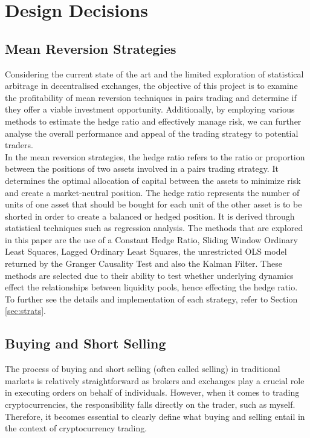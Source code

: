 \chapter{Design Decisions}

\section{Mean Reversion Strategies}
Considering the current state of the art and the limited exploration of statistical arbitrage in decentralised exchanges, the objective of this project is to examine the profitability of mean reversion techniques in pairs trading and determine if they offer a viable investment opportunity. Additionally, by employing various methods to estimate the hedge ratio and effectively manage risk, we can further analyse the overall performance and appeal of the trading strategy to potential traders.
\\[3mm]
In the mean reversion strategies, the hedge ratio refers to the ratio or proportion between the positions of two assets involved in a pairs trading strategy. It determines the optimal allocation of capital between the assets to minimize risk and create a market-neutral position. The hedge ratio represents the number of units of one asset that should be bought for each unit of the other asset is to be shorted in order to create a balanced or hedged position. It is derived through statistical techniques such as regression analysis. The methods that are explored in this paper are the use of a Constant Hedge Ratio, Sliding Window Ordinary Least Squares, Lagged Ordinary Least Squares, the unrestricted OLS model returned by the Granger Causality Test and also the Kalman Filter. These methods are selected due to their ability to test whether underlying dynamics effect the relationships between liquidity pools, hence effecting the hedge ratio. To further see the details and implementation of each strategy, refer to Section \ref{sec:strats}.

\section{Buying and Short Selling}
\label{sec:buying-selling}
The process of buying and short selling (often called selling) in traditional markets is relatively straightforward as brokers and exchanges play a crucial role in executing orders on behalf of individuals. However, when it comes to trading cryptocurrencies, the responsibility falls directly on the trader, such as myself. Therefore, it becomes essential to clearly define what buying and selling entail in the context of cryptocurrency trading.

